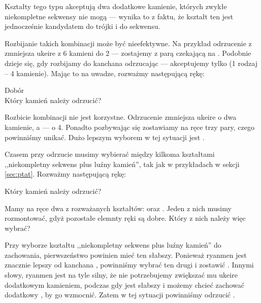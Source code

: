 Kształty tego typu akceptują dwa dodatkowe kamienie, których zwykłe niekompletne sekwensy nie mogą --- wynika to z faktu, że kształt ten jest jednocześnie kandydatem do trójki i do sekwensu.

\bigskip
Rozbijanie takich kombinacji może być nieefektywne.
Na przykład odrzucenie  z  zmniejsza {\jap ukeire} z 6 kamieni do 2 --- zostajemy z parą czekającą na .
Podobnie dzieje się, gdy rozbijamy do {\jap kanchan}a  odrzucając  --- akceptujemy tylko  (1 rodzaj -- 4 kamienie).
Mając to na uwadze, rozważmy następującą rękę:
\begin{screen}
	\vspace{-15pt}\hfill{\footnotesize{Dobór~~~~~~~~~}}\\
	\vspace{-2pt}Który kamień należy odrzucić?\vspace{-5pt}
\end{screen}
Rozbicie kombinacji  nie jest korzystne.
Odrzucenie  zmniejsza {\jap ukeire} o dwa kamienie, a  --- o 4.
Ponadto pozbywając się  zostawiamy na ręce trzy pary, czego powinniśmy unikać.
Dużo lepszym wyborem w tej sytuacji jest .
\bigskip

Czasem przy odrzucie musimy wybierać między kilkoma kształtami ,,niekompletny sekwens plus luźny kamień'', tak jak w przykładach w sekcji \ref{sec:ptat}.
Rozważmy następującą rękę:
\begin{screen}
	\vspace{-10pt}Który kamień należy odrzucić?\vspace{-5pt}
\end{screen}
Mamy na ręce dwa z rozważanych kształtów:  oraz .
Jeden z nich musimy rozmontować, gdyż pozostałe elemnty ręki są dobre.
Który z nich należy więc wybrać?

\bigskip
Przy wyborze kształtu ,,niekompletny sekwens plus luźny kamień'' do zachowania, pierwszeństwo powinien mieć ten słabszy.
Ponieważ {\jap ryanmen}  jest znacznie lepszy od {\jap kanchan}a , powinniśmy wybrać ten drugi i zostawić .
Innymi słowy, {\jap ryanmen}  jest na tyle silny, że nie potrzebujemy zwiększać mu {\jap ukeire} dodatkowym kamieniem, podczas gdy  jest słabszy i możemy chcieć zachować dodatkowy , by go wzmocnić.
Zatem w tej sytuacji powinniśmy odrzucić .

